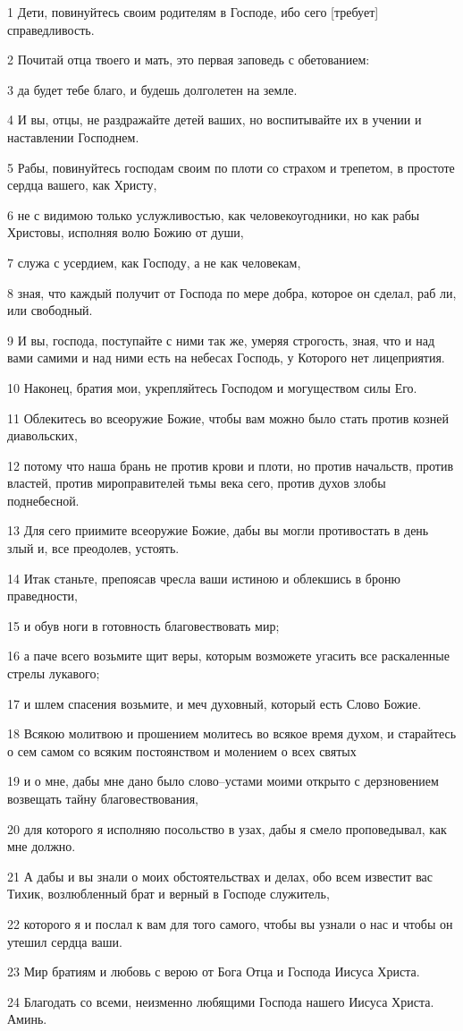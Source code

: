 \par 1 Дети, повинуйтесь своим родителям в Господе, ибо сего [требует] справедливость.
\par 2 Почитай отца твоего и мать, это первая заповедь с обетованием:
\par 3 да будет тебе благо, и будешь долголетен на земле.
\par 4 И вы, отцы, не раздражайте детей ваших, но воспитывайте их в учении и наставлении Господнем.
\par 5 Рабы, повинуйтесь господам своим по плоти со страхом и трепетом, в простоте сердца вашего, как Христу,
\par 6 не с видимою только услужливостью, как человекоугодники, но как рабы Христовы, исполняя волю Божию от души,
\par 7 служа с усердием, как Господу, а не как человекам,
\par 8 зная, что каждый получит от Господа по мере добра, которое он сделал, раб ли, или свободный.
\par 9 И вы, господа, поступайте с ними так же, умеряя строгость, зная, что и над вами самими и над ними есть на небесах Господь, у Которого нет лицеприятия.
\par 10 Наконец, братия мои, укрепляйтесь Господом и могуществом силы Его.
\par 11 Облекитесь во всеоружие Божие, чтобы вам можно было стать против козней диавольских,
\par 12 потому что наша брань не против крови и плоти, но против начальств, против властей, против мироправителей тьмы века сего, против духов злобы поднебесной.
\par 13 Для сего приимите всеоружие Божие, дабы вы могли противостать в день злый и, все преодолев, устоять.
\par 14 Итак станьте, препоясав чресла ваши истиною и облекшись в броню праведности,
\par 15 и обув ноги в готовность благовествовать мир;
\par 16 а паче всего возьмите щит веры, которым возможете угасить все раскаленные стрелы лукавого;
\par 17 и шлем спасения возьмите, и меч духовный, который есть Слово Божие.
\par 18 Всякою молитвою и прошением молитесь во всякое время духом, и старайтесь о сем самом со всяким постоянством и молением о всех святых
\par 19 и о мне, дабы мне дано было слово--устами моими открыто с дерзновением возвещать тайну благовествования,
\par 20 для которого я исполняю посольство в узах, дабы я смело проповедывал, как мне должно.
\par 21 А дабы и вы знали о моих обстоятельствах и делах, обо всем известит вас Тихик, возлюбленный брат и верный в Господе служитель,
\par 22 которого я и послал к вам для того самого, чтобы вы узнали о нас и чтобы он утешил сердца ваши.
\par 23 Мир братиям и любовь с верою от Бога Отца и Господа Иисуса Христа.
\par 24 Благодать со всеми, неизменно любящими Господа нашего Иисуса Христа. Аминь.


